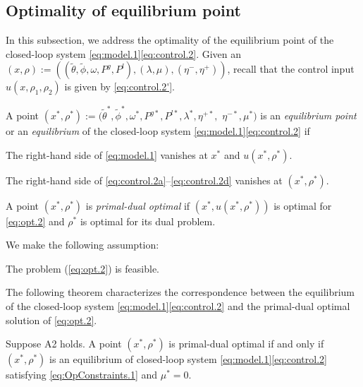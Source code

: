 \subsection{Optimality of equilibrium point}
\label{subsec:optimality.1}

In this subsection, we address the optimality of the equilibrium point of the closed-loop system \eqref{eq:model.1}\eqref{eq:control.2}. 
Given an $(x, \rho) := \left( (\tilde{\theta}, {\tilde{\phi}}, \omega,  P^{g}, P^{l}), (\lambda, \mu), (\eta^-, \eta^+)\right)$, recall that
the control input $u(x, \rho_1, \rho_2)$ is given by \eqref{eq:control.2'}.
\begin{definition}
        \label{def:ep.2}
        A point $(x^*, \rho^*) := ( \tilde{\theta}^*, {\tilde \phi}^*, \omega^*,  P^{g*}, P^{l*}, \lambda^*, \eta^{+*}, $ $ \eta^{-*}, \mu^* )$
        is an \emph{equilibrium point} or an \emph{equilibrium} of the closed-loop system 
        \eqref{eq:model.1}\eqref{eq:control.2} if 
        \bee
        \item The right-hand side of \eqref{eq:model.1} vanishes at $x^*$ and $u(x^*, \rho^*)$.  
        \item The right-hand side of \eqref{eq:control.2a}--\eqref{eq:control.2d} vanishes at $(x^*, \rho^*)$.
        \eee
\end{definition}

\begin{definition}
        A point $(x^*, \rho^*)$ is \emph{primal-dual optimal} if $(x^*, u(x^*, \rho^*))$ is optimal 
        for \eqref{eq:opt.2} and $\rho^*$ is optimal for its dual problem.
\end{definition}

We  make the following assumption:
\bi
\item[\textbf{A2:}]  
     The problem (\ref{eq:opt.2}) is feasible. 
\ei 
 
 The following theorem characterizes the correspondence between the equilibrium of the closed-loop system \eqref{eq:model.1}\eqref{eq:control.2} and the primal-dual optimal solution of  \eqref{eq:opt.2}. 
\begin{theorem}
        \label{thm:5}
        Suppose  A2  holds.   A point  $(x^*, \rho^*)$ is primal-dual optimal if
        and only if  $(x^*, \rho^*)$ is an equilibrium of  closed-loop 
        system \eqref{eq:model.1}\eqref{eq:control.2}  satisfying \eqref{eq:OpConstraints.1}
        and $\mu^*=0$.
\end{theorem}

